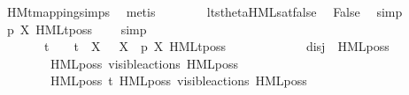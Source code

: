 \begin{isabellebody}
\ HMt{\isacharunderscore}{\kern0pt}mapping{\isachardot}{\kern0pt}simps{\isacharparenleft}{\kern0pt}{}{\isacharparenright}{\kern0pt}\ \isamarkupfalse%
\ metis\isanewline
\ \ \ \ \ \ \isamarkupfalse%
\ lts{\isacharunderscore}{\kern0pt}theta{\isachardot}{\kern0pt}HML{\isacharunderscore}{\kern0pt}sat{\isacharunderscore}{\kern0pt}false\ \isamarkupfalse%
\ False\ \isamarkupfalse%
\ simp\isanewline
\ \ \ \ \ \ \isamarkupfalse%
\ {\isacartoucheopen}p\ {\isasymTTurnstile}{\isacharbrackleft}{\kern0pt}X{\isacharbrackright}{\kern0pt}\ HMLt{\isacharunderscore}{\kern0pt}poss\ {\isasymalpha}\ {\isasymphi}{\isacartoucheclose}\ \isamarkupfalse%
\ simp\isanewline
\ \ \ \ \isamarkupfalse%
\isanewline
\ \ \ \ \isamarkupfalse%
\ \isamarkupfalse%
\ {\isacartoucheopen}{\isasymalpha}\ {\isasymnoteq}\ {\isasymtau}\ {\isasymand}\ {\isasymalpha}\ {\isasymnoteq}\ t\ {\isasymand}\ {\isasymalpha}\ {\isasymnoteq}\ t{\isacharunderscore}{\kern0pt}{\isasymepsilon}\ {\isasymand}\ {\isacharparenleft}{\kern0pt}{\isasymforall}X{\isachardot}{\kern0pt}\ {\isasymalpha}\ {\isasymnoteq}\ {\isasymepsilon}{\isacharbrackleft}{\kern0pt}X{\isacharbrackright}{\kern0pt}{\isacharparenright}{\kern0pt}\ {\isasymLongrightarrow}\ p\ {\isasymTTurnstile}{\isacharbrackleft}{\kern0pt}X{\isacharbrackright}{\kern0pt}\ HMLt{\isacharunderscore}{\kern0pt}poss\ {\isasymalpha}\ {\isasymphi}{\isacartoucheclose}\ \isamarkupfalse%
\ {\isacharminus}{\kern0pt}\isanewline
\ \ \ \ \ \ \isamarkupfalse%
\ {\isacharquery}{\kern0pt}disj\ {\isacharequal}{\kern0pt}\ {\isacartoucheopen}{\isacharbraceleft}{\kern0pt}HML{\isacharunderscore}{\kern0pt}poss\ {\isasymalpha}\ {\isasymsigma}{\isacharparenleft}{\kern0pt}{\isasymphi}{\isacharparenright}{\kern0pt}{\isacharcomma}{\kern0pt}\ \isanewline
\ \ \ \ \ \ \ \ HML{\isacharunderscore}{\kern0pt}poss\ {\isacharparenleft}{\kern0pt}{\isasymepsilon}{\isacharbrackleft}{\kern0pt}visible{\isacharunderscore}{\kern0pt}actions{\isacharbrackright}{\kern0pt}{\isacharparenright}{\kern0pt}\ {\isacharparenleft}{\kern0pt}HML{\isacharunderscore}{\kern0pt}poss\ {\isasymalpha}\ {\isasymsigma}{\isacharparenleft}{\kern0pt}{\isasymphi}{\isacharparenright}{\kern0pt}{\isacharparenright}{\kern0pt}{\isacharcomma}{\kern0pt}\isanewline
\ \ \ \ \ \ \ \ HML{\isacharunderscore}{\kern0pt}poss\ t{\isacharunderscore}{\kern0pt}{\isasymepsilon}\ {\isacharparenleft}{\kern0pt}HML{\isacharunderscore}{\kern0pt}poss\ {\isacharparenleft}{\kern0pt}{\isasymepsilon}{\isacharbrackleft}{\kern0pt}visible{\isacharunderscore}{\kern0pt}actions{\isacharbrackright}{\kern0pt}{\isacharparenright}{\kern0pt}\ {\isacharparenleft}{\kern0pt}HML{\isacharunderscore}{\kern0pt}poss\ {\isasymalpha}\ {\isasymsigma}{\isacharparenleft}{\kern0pt}{\isasymphi}{\isacharparenright}{\kern0pt}{\isacharparenright}{\kern0pt}{\isacharparenright}{\kern0pt}{\isacharbraceright}{\kern0pt}{\isacartoucheclose}\isanewline

\end{isabellebody}
